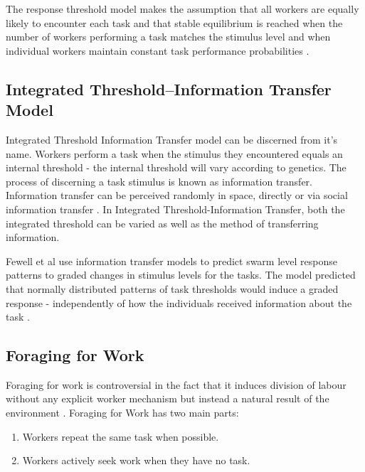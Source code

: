 The response threshold model makes the assumption that all workers are equally likely to encounter each task and that stable equilibrium is reached when the number of workers performing a task matches the stimulus level and when individual workers maintain constant task performance probabilities \cite{page1990self}.

\subsection{Integrated Threshold--Information Transfer Model}
\label{integratedthreshold}

Integrated Threshold Information Transfer model can be discerned from it's name. Workers perform a task when the stimulus they encountered equals an internal threshold - the internal threshold will vary according to genetics. The process of discerning a task stimulus is known as information transfer. Information transfer can be perceived randomly in space, directly or via social information transfer  \cite{fewell1999division}. In Integrated Threshold-Information Transfer, both the integrated threshold can be varied as well as the method of transferring information.

Fewell et al  use information transfer models to predict swarm level response patterns to graded changes in stimulus levels for the tasks. The model predicted that normally distributed patterns of task thresholds would induce a graded response - independently of how the individuals received information about the task \cite{fewell1999division}.


\subsection{Foraging for Work}

Foraging for work is controversial in the fact that it induces division of labour without any explicit worker mechanism but instead a natural result of the environment \cite{beshers2001models}.  
Foraging for Work has two main parts:
\begin{enumerate}
	\item Workers repeat the same task when possible.
	\item Workers actively seek work when they have no task.
\end{enumerate}


